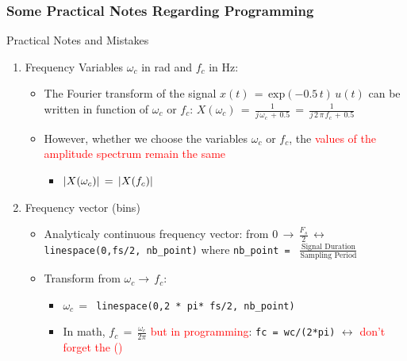 \documentclass{beamer}
\begin{document}
\subsubsection{Some Practical Notes Regarding Programming}

\begin{frame}{Practical Notes and Mistakes}

\begin{enumerate}

\item Frequency Variables $\omega_c$ in rad and $f_c$ in Hz:

	\begin{itemize}
	\item The Fourier transform of the signal $x(t) \, = \, \text{exp}(-0.5 \, t) \, u(t)$ can be written in function of $\omega_c$ or $f_c$: $  X(\omega_c) \, = \, \displaystyle\frac{1}{j \, \omega_c\, + \, 0.5} \, = \, \displaystyle\frac{1}{j \, 2 \,\pi \,f_c\, + \, 0.5}$ 
	
	\item However, whether we choose the variables  $\omega_c$ or $f_c$, the \textcolor{red}{values of the amplitude spectrum remain the same}
	
		\begin{itemize}
		\item $\displaystyle\left\lvert X(\omega_c) \displaystyle\right\rvert \, = \, \displaystyle\left\lvert X(f_c) \displaystyle\right\rvert$
		\end{itemize}
	\end{itemize}

\newpage
\item Frequency vector (bins)

	\begin{itemize}
	\item Analyticaly continuous frequency vector: from $0 \, \rightarrow \, \displaystyle\frac{F_s}{2} \, \leftrightarrow \,$ \verb|linespace(0,fs/2, nb_point)| where \verb|nb_point = | $\displaystyle\frac{\text{Signal Duration}}{\text{Sampling Period}}$
	
	\item Transform from $\omega_c \rightarrow \, f_c$: 
	
	\begin{itemize}
	\item $\omega_c \, = \, $ \verb|linespace(0,2 * pi* fs/2, nb_point)|
	
	\item In math, $f_c \, = \, \displaystyle\frac{\omega_c}{2 \pi}$ \textcolor{red}{but in programming}: \verb|fc = wc/(2*pi)| $\leftrightarrow$ \textcolor{red}{don't forget the ()}
	

\end{itemize}
\end{itemize}
\end{enumerate}
\end{frame}
\end{document}
